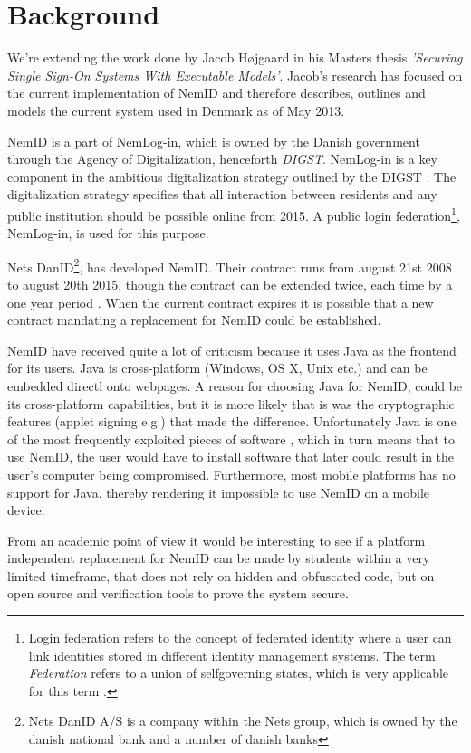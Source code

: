 \documentclass[twosided]{report}
\begin{document}
\section{Background}
We're extending the work done by Jacob H{\o}jgaard in his Masters thesis \emph{'Securing Single Sign-On Systems With Executable Models'}. Jacob's research has focused on the current implementation of NemID and therefore describes, outlines and models the current system used in Denmark as of May 2013.
\par
NemID is a part of NemLog-in, which is owned by the Danish government through the Agency of Digitalization, henceforth \emph{DIGST}. NemLog-in is a key component in the ambitious digitalization strategy outlined by the DIGST \cite{digst}. The digitalization strategy specifies that all interaction between residents and any public institution should be possible online from 2015. A public login federation\footnote{Login federation refers to the concept of federated identity where a user can link identities stored in different identity management systems. The term \emph{Federation} refers to a union of selfgoverning states, which is very applicable for this term \cite{jacob}.}, NemLog-in, is used for this purpose.
\par
Nets DanID\footnote{Nets DanID A/S is a company within the Nets group, which is owned by the danish national bank and a number of danish banks}, has developed NemID. Their contract runs from august 21st 2008 to august 20th 2015, though the contract can be extended twice, each time by a one year period \cite{nemidcontract}. When the current contract expires it is possible that a new contract mandating a replacement for NemID could be established.
\par
NemID have received quite a lot of criticism because it uses Java as the frontend for its users.  Java is cross-platform (Windows, OS X, Unix etc.) and can be embedded directl onto webpages. A reason for choosing Java for NemID, could be  its cross-platform capabilities, but it is more likely that is was the cryptographic features (applet signing e.g.) that made the difference. Unfortunately Java is one of the most frequently exploited pieces of software \cite{kaspersky}, which in turn means that to use NemID, the user would have to install software that later could result in the user's computer being compromised. Furthermore, most mobile platforms has no support for Java, thereby rendering it impossible to use NemID on a mobile device.
\par
From an academic point of view it would be interesting to see if a platform independent replacement for NemID can be made by students within a very limited timeframe, that does not rely on hidden and obfuscated code, but on open source and verification tools to prove the system secure.
\end{document}
